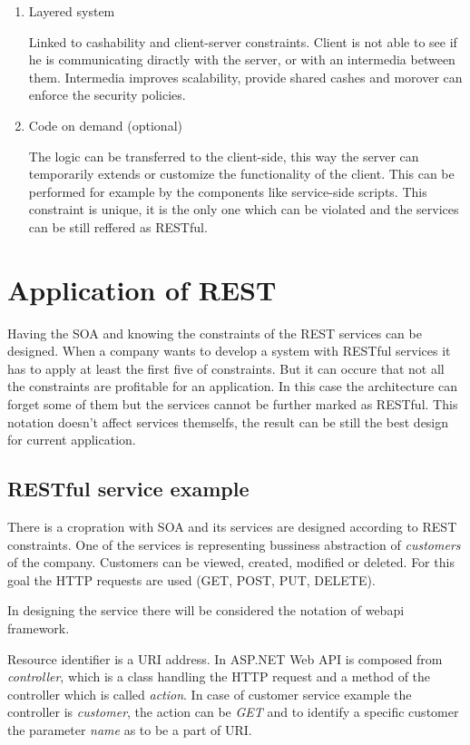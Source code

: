 \begin{description}
\begin{enumerate}
\item Layered system

Linked to cashability and client-server constraints. Client is not able to see if he is communicating diractly with the server, or with an intermedia between them. Intermedia improves scalability, provide shared cashes and morover can enforce the security policies.

\item Code on demand (optional)

The logic can be transferred to the client-side, this way the server can temporarily extends or customize the functionality of the client. This can be performed for example by the components like service-side scripts.
This constraint is unique, it is the only one which can be violated and the services can be still reffered as RESTful.

\end{enumerate}
\end{description}

\bigskip
\section{Application of REST}

Having the SOA and knowing the constraints of the REST services can be designed. When a company wants to develop a system with RESTful services it has to apply at least the first five of constraints. But it can occure that not all the constraints are profitable for an application. In this case the architecture can forget some of them but the services cannot be further marked as RESTful. This notation doesn't affect services themselfs, the result can be still the best design for current application.

\subsection{RESTful service example}
There is a cropration with SOA and its services are designed according to REST constraints. One of the services is representing bussiness abstraction of \emph{customers} of the company. Customers can be viewed, created, modified or deleted. For this goal the HTTP requests are used (GET, POST, PUT, DELETE). 

In designing the service there will be considered the notation of \gls{webapi} \gls{framework}. 

Resource identifier is a URI address. In ASP.NET Web API is composed from \emph{controller}, which is a class handling the HTTP request and a method of the controller which is called \emph{action}. In case of customer service example the controller is \emph{customer}, the action can be \emph{GET} and to identify a specific customer the parameter \emph{name} as to be a part of URI.

